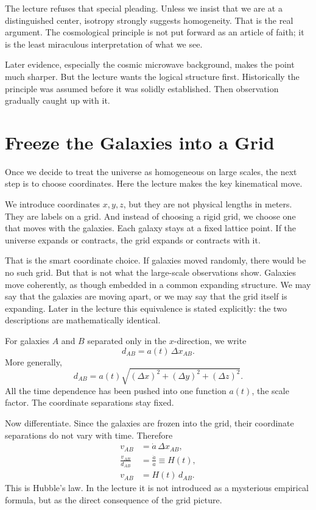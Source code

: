 The lecture refuses that special pleading. Unless we insist that we are at a distinguished center, isotropy strongly suggests homogeneity. That is the real argument. The cosmological principle is not put forward as an article of faith; it is the least miraculous interpretation of what we see.

Later evidence, especially the cosmic microwave background, makes the point much sharper. But the lecture wants the logical structure first. Historically the principle was assumed before it was solidly established. Then observation gradually caught up with it.

\section{Freeze the Galaxies into a Grid}

Once we decide to treat the universe as homogeneous on large scales, the next step is to choose coordinates. Here the lecture makes the key kinematical move.

We introduce coordinates \(x,y,z\), but they are not physical lengths in meters. They are labels on a grid. And instead of choosing a rigid grid, we choose one that moves with the galaxies. Each galaxy stays at a fixed lattice point. If the universe expands or contracts, the grid expands or contracts with it.

That is the smart coordinate choice. If galaxies moved randomly, there would be no such grid. But that is not what the large-scale observations show. Galaxies move coherently, as though embedded in a common expanding structure. We may say that the galaxies are moving apart, or we may say that the grid itself is expanding. Later in the lecture this equivalence is stated explicitly: the two descriptions are mathematically identical.

For galaxies \(A\) and \(B\) separated only in the \(x\)-direction, we write
\begin{equation}
d_{AB}=a(t)\,\Delta x_{AB}.
\end{equation}
More generally,
\begin{equation}
d_{AB}=a(t)\sqrt{(\Delta x)^2+(\Delta y)^2+(\Delta z)^2}.
\end{equation}
All the time dependence has been pushed into one function \(a(t)\), the scale factor. The coordinate separations stay fixed.

Now differentiate. Since the galaxies are frozen into the grid, their coordinate separations do not vary with time. Therefore
\begin{align}
v_{AB}&=\dot a\,\Delta x_{AB},\\
\frac{v_{AB}}{d_{AB}}&=\frac{\dot a}{a}\equiv H(t),\\
v_{AB}&=H(t)\,d_{AB}.
\end{align}
This is Hubble's law. In the lecture it is not introduced as a mysterious empirical formula, but as the direct consequence of the grid picture.

